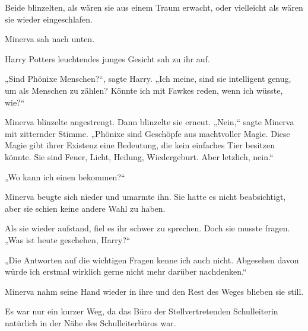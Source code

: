 Beide blinzelten, als wären sie aus einem Traum erwacht, oder vielleicht als wären sie wieder eingeschlafen.

Minerva sah nach unten.

Harry Potters leuchtendes junges Gesicht sah zu ihr auf.

„Sind Phönixe Menschen?“, sagte Harry. „Ich meine, sind sie intelligent genug, um als Menschen zu zählen? Könnte ich mit Fawkes reden, wenn ich wüsste, wie?“

Minerva blinzelte angestrengt. Dann blinzelte sie erneut. „Nein,“ sagte Minerva mit zitternder Stimme. „Phönixe sind Geschöpfe aus machtvoller Magie. Diese Magie gibt ihrer Existenz eine Bedeutung, die kein einfaches Tier besitzen könnte. Sie sind Feuer, Licht, Heilung, Wiedergeburt. Aber letzlich, nein.“

„Wo kann ich einen bekommen?“

Minerva beugte sich nieder und umarmte ihn. Sie hatte es nicht beabsichtigt, aber sie schien keine andere Wahl zu haben.

Als sie wieder aufstand, fiel es ihr schwer zu sprechen. Doch sie musste fragen. „Was ist heute geschehen, Harry?“

„Die Antworten auf die wichtigen Fragen kenne ich auch nicht. Abgesehen davon würde ich erstmal wirklich gerne nicht mehr darüber nachdenken.“

Minerva nahm seine Hand wieder in ihre und den Rest des Weges blieben sie still.

Es war nur ein kurzer Weg, da das Büro der Stellvertretenden Schulleiterin natürlich in der Nähe des Schulleiterbüros war.

